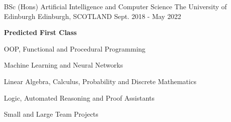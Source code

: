 \begin{cventries}
  \cventry
    {BSc (Hons) Artificial Intelligence and Computer Science} %
    {The University of Edinburgh} %
    {Edinburgh, SCOTLAND} %
    {Sept. 2018 - May 2022} %
    {
        \textbf{Predicted First Class}
        \vspace{1.35em}
        \begin{cvitems} %
            \item OOP, Functional and Procedural Programming
            \item Machine Learning and Neural Networks
            \item Linear Algebra, Calculus, Probability and Discrete Mathematics
            \item Logic, Automated Reasoning and Proof Assistants
            \item Small and Large Team Projects
        \end{cvitems}
    }
\end{cventries}
